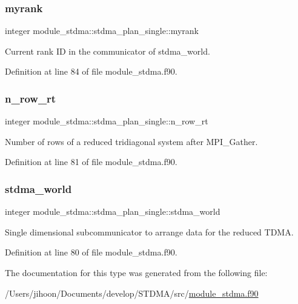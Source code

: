 \subsubsection{\texorpdfstring{myrank}{myrank}}
{\footnotesize\ttfamily integer module\+\_\+stdma\+::stdma\+\_\+plan\+\_\+single\+::myrank}



Current rank ID in the communicator of stdma\+\_\+world. 



Definition at line 84 of file module\+\_\+stdma.\+f90.

\mbox{\label{structmodule__stdma_1_1stdma__plan__single_a1cc9c2f1cb33d4b1a9bae31c194e216c}} 
\subsubsection{\texorpdfstring{n\_row\_rt}{n\_row\_rt}}
{\footnotesize\ttfamily integer module\+\_\+stdma\+::stdma\+\_\+plan\+\_\+single\+::n\+\_\+row\+\_\+rt}



Number of rows of a reduced tridiagonal system after M\+P\+I\+\_\+\+Gather. 



Definition at line 81 of file module\+\_\+stdma.\+f90.

\mbox{\label{structmodule__stdma_1_1stdma__plan__single_acb8e449ecd91e246509129edc25216f4}} 
\subsubsection{\texorpdfstring{stdma\_world}{stdma\_world}}
{\footnotesize\ttfamily integer module\+\_\+stdma\+::stdma\+\_\+plan\+\_\+single\+::stdma\+\_\+world}



Single dimensional subcommunicator to arrange data for the reduced T\+D\+MA. 



Definition at line 80 of file module\+\_\+stdma.\+f90.



The documentation for this type was generated from the following file\+:\begin{DoxyCompactItemize}
\item 
/\+Users/jihoon/\+Documents/develop/\+S\+T\+D\+M\+A/src/\mbox{\hyperlink{module__stdma_8f90}{module\+\_\+stdma.\+f90}}\end{DoxyCompactItemize}
